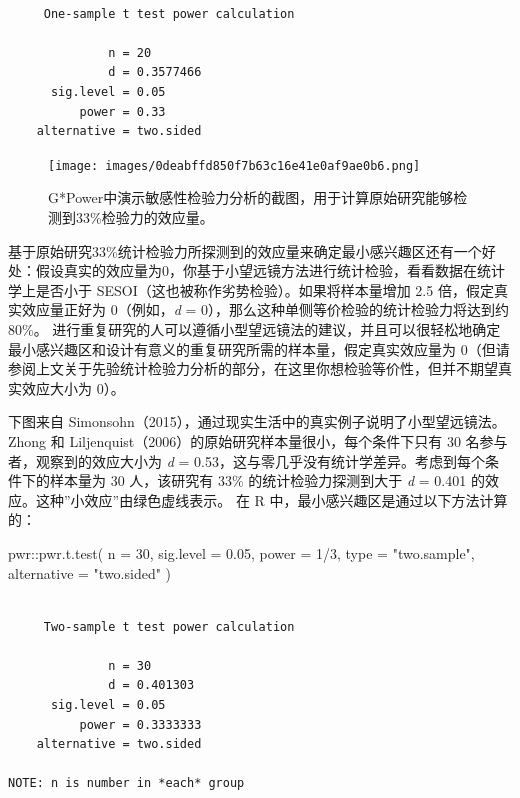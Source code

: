\documentclass[
  letterpaper,
  DIV=11,
  numbers=noendperiod]{scrreprt}
\newenvironment{Shaded}{\begin{snugshade}}{\end{snugshade}}
\newcommand{\AttributeTok}[1]{\textcolor[rgb]{0.40,0.45,0.13}{#1}}
\newcommand{\DecValTok}[1]{\textcolor[rgb]{0.68,0.00,0.00}{#1}}
\newcommand{\FloatTok}[1]{\textcolor[rgb]{0.68,0.00,0.00}{#1}}
\newcommand{\FunctionTok}[1]{\textcolor[rgb]{0.28,0.35,0.67}{#1}}
\newcommand{\NormalTok}[1]{\textcolor[rgb]{0.00,0.23,0.31}{#1}}
\newcommand{\SpecialCharTok}[1]{\textcolor[rgb]{0.37,0.37,0.37}{#1}}
\newcommand{\StringTok}[1]{\textcolor[rgb]{0.13,0.47,0.30}{#1}}
\begin{document}
\begin{verbatim}

     One-sample t test power calculation 

              n = 20
              d = 0.3577466
      sig.level = 0.05
          power = 0.33
    alternative = two.sided
\end{verbatim}

\begin{figure}

{\centering \texttt{[image: images/0deabffd850f7b63c16e41e0af9ae0b6.png]}

}

\caption{\label{fig-smalltelpower}G*Power中演示敏感性检验力分析的截图，用于计算原始研究能够检测到33\%检验力的效应量。}

\end{figure}

基于原始研究33\%统计检验力所探测到的效应量来确定最小感兴趣区还有一个好处：假设真实的效应量为0，你基于小望远镜方法进行统计检验，看看数据在统计学上是否小于
SESOI（这也被称作劣势检验）。如果将样本量增加 2.5
倍，假定真实效应量正好为 0（例如，\emph{d} =
0），那么这种单侧等价检验的统计检验力将达到约 80\%。
进行重复研究的人可以遵循小型望远镜法的建议，并且可以很轻松地确定最小感兴趣区和设计有意义的重复研究所需的样本量，假定真实效应量为
0（但请参阅上文关于先验统计检验力分析的部分，在这里你想检验等价性，但并不期望真实效应大小为
0）。

下图来自 Simonsohn（2015），通过现实生活中的真实例子说明了小型望远镜法。
Zhong 和 Liljenquist（2006）的原始研究样本量很小，每个条件下只有 30
名参与者，观察到的效应大小为 \emph{d} =
0.53，这与零几乎没有统计学差异。考虑到每个条件下的样本量为 30
人，该研究有 33\% 的统计检验力探测到大于 \emph{d} = 0.401
的效应。这种''小效应''由绿色虚线表示。 在 R
中，最小感兴趣区是通过以下方法计算的：

\begin{Shaded}
\begin{Highlighting}[]
\NormalTok{pwr}\SpecialCharTok{::}\FunctionTok{pwr.t.test}\NormalTok{(}
  \AttributeTok{n =} \DecValTok{30}\NormalTok{, }
  \AttributeTok{sig.level =} \FloatTok{0.05}\NormalTok{, }
  \AttributeTok{power =} \DecValTok{1}\SpecialCharTok{/}\DecValTok{3}\NormalTok{, }
  \AttributeTok{type =} \StringTok{"two.sample"}\NormalTok{,}
  \AttributeTok{alternative =} \StringTok{"two.sided"}
\NormalTok{)}
\end{Highlighting}
\end{Shaded}

\begin{verbatim}

     Two-sample t test power calculation 

              n = 30
              d = 0.401303
      sig.level = 0.05
          power = 0.3333333
    alternative = two.sided

NOTE: n is number in *each* group
\end{verbatim}
\end{document}
